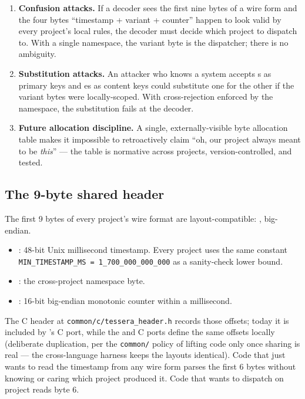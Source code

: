 \begin{enumerate}
\item \textbf{Confusion attacks.} If a decoder sees the first nine bytes of a wire form and the four bytes ``timestamp + variant + counter'' happen to look valid by every project's local rules, the decoder must decide which project to dispatch to. With a single namespace, the variant byte is the dispatcher; there is no ambiguity.
\item \textbf{Substitution attacks.} An attacker who knows a system accepts \tesseraid{}s as primary keys and \tesserahash{}es as content keys could substitute one for the other if the variant bytes were locally-scoped. With cross-rejection enforced by the namespace, the substitution fails at the decoder.
\item \textbf{Future allocation discipline.} A single, externally-visible byte allocation table makes it impossible to retroactively claim ``oh, our project always meant  to be \emph{this}'' --- the table is normative across projects, version-controlled, and tested.
\end{enumerate}

\subsection{The 9-byte shared header}

The first 9 bytes of every project's wire format are layout-compatible: , big-endian.

\begin{itemize}
\item {}: 48-bit Unix millisecond timestamp. Every project uses the same constant \texttt{MIN\_TIMESTAMP\_MS = 1\_700\_000\_000\_000} as a sanity-check lower bound.
\item {}: the cross-project namespace byte.
\item {}: 16-bit big-endian monotonic counter within a millisecond.
\end{itemize}

The C header at \texttt{common/c/tessera\_header.h} records those offsets; today it is included by \tesseraseal{}'s C port, while the \tesseraid{} and \tesserahash{} C ports define the same offsets locally (deliberate duplication, per the \texttt{common/} policy of lifting code only once sharing is real --- the cross-language harness keeps the layouts identical). Code that just wants to read the timestamp from any \tessera{} wire form parses the first 6 bytes without knowing or caring which project produced it. Code that wants to dispatch on project reads byte 6.

